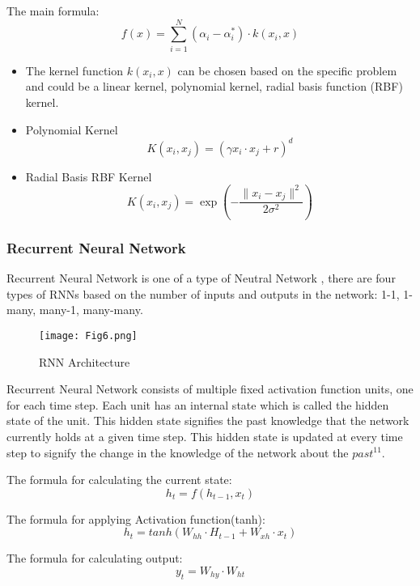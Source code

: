 \documentclass{ieeeojies}
\begin{document}
The main formula:
\begin{equation*}
    f(x) = \sum_{i=1}^N (\alpha_i - \alpha_i^{*})\cdot k(x_i,x)
\end{equation*}

\begin{itemize}
    \item The kernel function $k(x_i,x)$  can be chosen based on the specific problem and could be a linear kernel, polynomial kernel, radial basis function (RBF) kernel.
    \item Polynomial Kernel 
\[K(x_i, x_j) = (\gamma x_i \cdot x_j + r)^d\]

    \item Radial Basis RBF Kernel
\[K(x_i, x_j) = \exp\left(-\frac{\|x_i - x_j\|^2}{2\sigma^2}\right)\]

\end{itemize}
\subsubsection{\textbf{Recurrent Neural Network}}
Recurrent Neural Network is one of a type of Neutral Network , there are four types of RNNs based on the number of inputs and outputs in the network: 1-1, 1-many, many-1, many-many.

\begin{figure}[ht]
  \centering
  \texttt{[image: Fig6.png]}
  \caption{RNN Architecture}
  \label{fig:example}
\end{figure}

Recurrent Neural Network consists of multiple fixed activation function units, one for each time step. Each unit has an internal state which is called the hidden state of the unit. This hidden state signifies the past knowledge that the network currently holds at a given time step. This hidden state is updated at every time step to signify the change in the knowledge of the network about the $past^{11}$.

The formula for calculating the current state:
\begin{equation*}
    h_t = f(h_{t-1},x_t)
\end{equation*}

The formula for applying Activation function(tanh):
\begin{equation*}
    h_t = tanh(W_{hh}\cdot H_{t-1} + W_{xh}\cdot x_t)
\end{equation*}

The formula for calculating output:
\begin{equation*}
    y_t = W_{hy}\cdot W_{ht}
\end{equation*}
\end{document}
